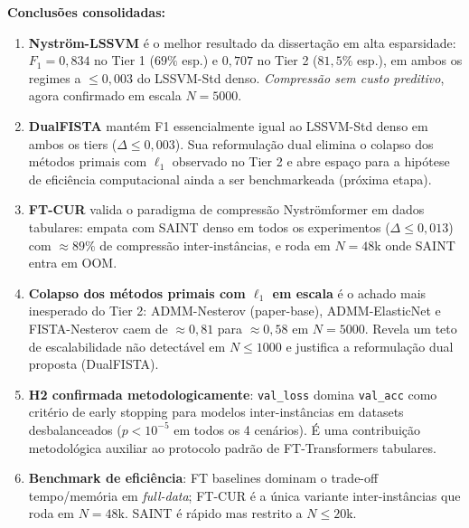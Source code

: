 \documentclass[12pt,a4paper]{article}
\begin{document}
\textbf{Conclusões consolidadas:}
\begin{enumerate}
  \item \textbf{Nyström-LSSVM} é o melhor resultado da dissertação em alta
        esparsidade: $F_1 = 0{,}834$ no Tier 1 (\(69\%\) esp.) e $0{,}707$
        no Tier 2 (\(81{,}5\%\) esp.), em ambos os regimes a $\leq 0{,}003$
        do LSSVM-Std denso. \emph{Compressão sem custo preditivo}, agora
        confirmado em escala $N=5000$.
  \item \textbf{DualFISTA} mantém F1 essencialmente igual ao LSSVM-Std
        denso em ambos os tiers ($\Delta \leq 0{,}003$). Sua reformulação
        dual elimina o colapso dos métodos primais com $\ell_1$ observado
        no Tier 2 e abre espaço para a hipótese de eficiência computacional
        ainda a ser benchmarkeada (próxima etapa).
  \item \textbf{FT-CUR} valida o paradigma de compressão Nyströmformer em
        dados tabulares: empata com SAINT denso em todos os experimentos
        ($\Delta \leq 0{,}013$) com \(\approx 89\%\) de compressão
        inter-instâncias, e roda em $N=48$k onde SAINT entra em OOM.
  \item \textbf{Colapso dos métodos primais com $\ell_1$ em escala} é o
        achado mais inesperado do Tier 2: ADMM-Nesterov (paper-base),
        ADMM-ElasticNet e FISTA-Nesterov caem de $\approx 0{,}81$ para
        $\approx 0{,}58$ em $N=5000$. Revela um teto de escalabilidade
        não detectável em $N \leq 1000$ e justifica a reformulação dual
        proposta (DualFISTA).
  \item \textbf{H2 confirmada metodologicamente}: \texttt{val\_loss}
        domina \texttt{val\_acc} como critério de early stopping para
        modelos inter-instâncias em datasets desbalanceados
        ($p < 10^{-5}$ em todos os 4 cenários). É uma contribuição
        metodológica auxiliar ao protocolo padrão de FT-Transformers
        tabulares.
  \item \textbf{Benchmark de eficiência}: FT baselines dominam o
        trade-off tempo/memória em \emph{full-data}; FT-CUR é a única
        variante inter-instâncias que roda em $N=48$k. SAINT é rápido
        mas restrito a $N \leq 20$k.
\end{enumerate}
\end{document}
